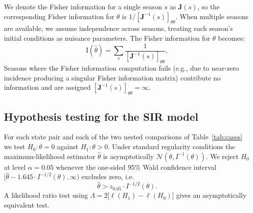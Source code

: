 \documentclass[11pt]{article}
\begin{document}
We denote the Fisher information for a single season $s$ as
$\mathbf{J}(s)$, so the corresponding Fisher information for $\theta$
is $1 / [\mathbf{J}^{-1}(s)]_{\theta\theta}$. When multiple seasons
are available, we assume independence across seasons, treating each
season's initial conditions as nuisance parameters. The Fisher
information for $\theta$ becomes:
\begin{equation}\label{eq:crlb_multi}
\text{I}(\hat{\theta}) = \sum_{s} \frac{1}{
  [\mathbf{J}^{-1}(s)]_{\theta\theta}},
\end{equation}
Seasons where the Fisher information computation fails (e.g., due to
near-zero incidence producing a singular Fisher information matrix)
contribute no information and are assigned
$[\mathbf{J}^{-1}(s)]_{\theta\theta} = \infty$.



\subsection{Hypothesis testing for the SIR model}\label{subsec:hyp}
For each state pair and each of the two nested comparisons of
Table~\ref{tab:cases} we test $H_0: \theta = 0$ against $H_1: \theta >
0$. Under standard regularity conditions the maximum-likelihood
estimator $\hat\theta$ is asymptotically $\mathcal{N}(\theta,
I^{-1}(\theta))$.  We reject $H_0$ at level $\alpha = 0.05$ whenever
the one-sided $95\%$ Wald confidence interval $[\hat\theta -
  1.645 \cdot I^{-1/2}(\theta), \infty)$ excludes zero, i.e.
\begin{equation}\label{eq:wald}
  \hat\theta > z_{0.05}\cdot  I^{-1/2}(\theta).
\end{equation}
A likelihood ratio test using $\Lambda = 2\bigl[\ell(H_1) -
  \ell(H_0)\bigr]$ gives an asymptotically equivalent test.
\end{document}
